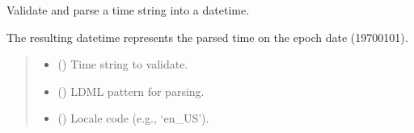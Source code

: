 \documentclass[letterpaper,10pt,english]{sphinxmanual}
\begin{document}
\begin{fulllineitems}

\begin{fulllineitems}
\label{\detokenize{apache_commons_validator_python.routines:apache_commons_validator_python.routines.time_validator.TimeValidator.validate}}
\pysigstartsignatures
{}
\pysigstopsignatures
\sphinxAtStartPar
Validate and parse a time string into a datetime.

\sphinxAtStartPar
The resulting datetime represents the parsed time on the epoch date
(1970\sphinxhyphen{}01\sphinxhyphen{}01).
\begin{quote}\begin{description}
\begin{itemize}
\item {} 
\sphinxAtStartPar
{} () \textendash{} Time string to validate.

\item {} 
\sphinxAtStartPar
{} (\sphinxstyleliteralemphasis{\sphinxupquote{, }}) \textendash{} LDML pattern for parsing.

\item {} 
\sphinxAtStartPar
{} (\sphinxstyleliteralemphasis{\sphinxupquote{, }}) \textendash{} Locale code (e.g., ‘en\_US’).


\end{itemize}
\end{description}
\end{quote}
\end{fulllineitems}
\end{fulllineitems}
\end{document}
